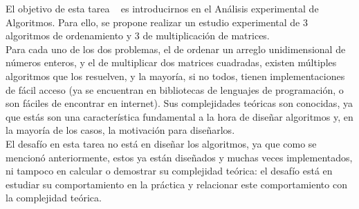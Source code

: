 El objetivo de esta tarea \tnum~ es introducirnos
en el Análisis experimental de Algoritmos. Para ello,
se propone realizar un estudio experimental de 3 algoritmos
de ordenamiento y 3 de multiplicación de matrices. \\

Para cada uno de los dos problemas, el de ordenar un arreglo unidimensional de números enteros, y el de multiplicar dos matrices cuadradas, existen múltiples algoritmos que los resuelven, y la mayoría, si no todos, tienen implementaciones de fácil acceso (ya se encuentran en bibliotecas de lenguajes de programación, o son fáciles de encontrar en internet). Sus complejidades teóricas son conocidas, ya que estás son una característica fundamental a la hora de diseñar algoritmos y, en la mayoría de los casos, la motivación para diseñarlos. \\

El desafío en esta tarea no está en diseñar los algoritmos, ya que como se mencionó anteriormente, estos ya están diseñados y muchas veces implementados, ni tampoco en calcular o demostrar su complejidad teórica: el desafío está en estudiar su comportamiento en la práctica y relacionar este comportamiento con la complejidad teórica. \\





